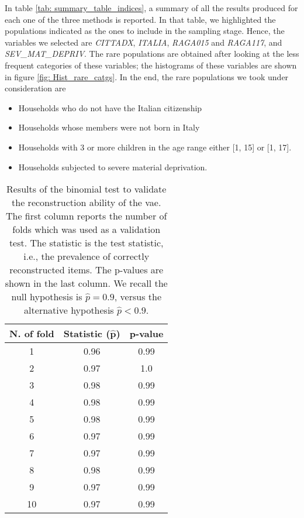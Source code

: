In table \ref{tab: summary_table_indices}, a summary of all the results produced for each one of the three methods is reported.
In that table, we highlighted the populations indicated as the ones to include in the sampling stage.
Hence, the variables we selected are \textit{CITTADX}, \textit{ITALIA}, \textit{RAGA015} and \textit{RAGA117}, and \textit{SEV\_MAT\_DEPRIV}.
The rare populations are obtained after looking at the less frequent categories of these variables; the histograms of these variables are shown in figure \ref{fig: Hist_rare_catgs}.
In the end, the rare populations we took under consideration are 
\begin{itemize}
    \item Households who do not have the Italian citizenship
    \item Households whose members were not born in Italy
    \item Households with 3 or more children in the age range either [1, 15] or [1, 17].
    \item Households subjected to severe material deprivation.
\end{itemize}
\begin{table}[!]
    \centering
    \begin{tabular}{|c|c|c|}
        \hline
         \textbf{N. of fold} & \textbf{Statistic} ($\boldsymbol{\hat{p}}$) &  \textbf{p-value}\\
         \hline
         1 & 0.96 & 0.99\\
         \hline
         2 & 0.97 & 1.0\\
         \hline
         3 & 0.98 & 0.99\\
         \hline
         4 & 0.98 & 0.99\\
         \hline
         5 & 0.98 & 0.99\\
         \hline
         6 & 0.97 & 0.99\\
         \hline
         7 & 0.97 & 0.99\\
         \hline
         8 & 0.98 & 0.99\\
         \hline
         9 & 0.97 & 0.99\\
         \hline
         10 & 0.97 & 0.99\\
            \hline
    \end{tabular}
    \caption{Results of the binomial test to validate the reconstruction ability of the \gls{vae}. The first column reports the number of folds which was used as a validation test. The statistic is the test statistic, i.e., the prevalence of correctly reconstructed items. The p-values are shown in the last column. We recall the null hypothesis is $\hat{p} = 0.9$, versus the alternative hypothesis $\hat{p} < 0.9$.}
    \label{tab: vae_binomial_tests}
\end{table}
